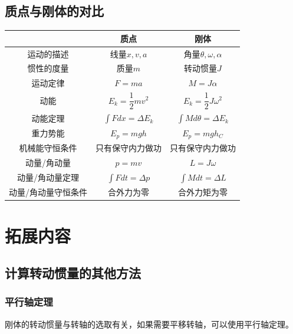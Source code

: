 \subsection{质点与刚体的对比}

\begin{center}
    \begin{tabular}{|c|c|c|}
        \hline
         & 质点 & 刚体 \\
        \hline
        运动的描述 & 线量$x,v,a$ & 角量$\theta, \omega, \alpha$ \\
        \hline
        惯性的度量 & 质量$m$ & 转动惯量$J$ \\
        \hline
        运动定律 & $F=ma$ & $M=J\alpha$ \\
        \hline
        \rule{0pt}{18pt}\rule[-12pt]{0pt}{0pt} 动能 & $E_k=\dfrac{1}{2}mv^2$ & $E_k=\dfrac{1}{2}J\omega^2$ \\
        \hline
        \rule{0pt}{18pt}\rule[-12pt]{0pt}{0pt} 动能定理 & $\displaystyle\int{Fdx}=\Delta E_k$ & $\displaystyle\int{Md\theta}=\Delta E_k$ \\
        \hline
        重力势能 & $E_p=mgh$ & $E_p=mgh_C$ \\
        \hline
        机械能守恒条件 & 只有保守内力做功 & 只有保守内力做功 \\
        \hline
        动量/角动量 & $p=mv$ & $L=J\omega$ \\
        \hline
        \rule{0pt}{18pt}\rule[-12pt]{0pt}{0pt} 动量/角动量定理 & $\displaystyle\int{Fdt}=\Delta p$ & $\displaystyle\int{Mdt}=\Delta L$ \\
        \hline
        动量/角动量守恒条件 & 合外力为零 & 合外力矩为零 \\
        \hline
    \end{tabular}
\end{center}


\section{拓展内容}

\subsection{计算转动惯量的其他方法}

\subsubsection{平行轴定理}

刚体的转动惯量与转轴的选取有关，如果需要平移转轴，可以使用平行轴定理。

